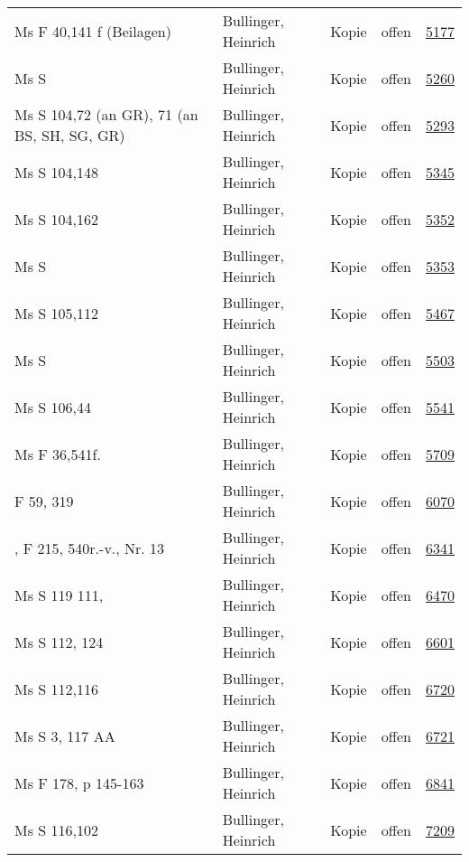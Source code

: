 \documentclass[10pt,a4paper,landscape]{report}
\begin{document}
\begin{longtable}{p{16cm}p{4cm}llr}
Ms F 40,141 f (Beilagen)	&	Bullinger, Heinrich	&	Kopie	&	offen	&	\href{http://130.60.24.72/assignment/5177}{5177}\\
Ms S	&	Bullinger, Heinrich	&	Kopie	&	offen	&	\href{http://130.60.24.72/assignment/5260}{5260}\\
Ms S 104,72 (an GR), 71 (an BS, SH, SG, GR)	&	Bullinger, Heinrich	&	Kopie	&	offen	&	\href{http://130.60.24.72/assignment/5293}{5293}\\
Ms S 104,148	&	Bullinger, Heinrich	&	Kopie	&	offen	&	\href{http://130.60.24.72/assignment/5345}{5345}\\
Ms S 104,162	&	Bullinger, Heinrich	&	Kopie	&	offen	&	\href{http://130.60.24.72/assignment/5352}{5352}\\
Ms S	&	Bullinger, Heinrich	&	Kopie	&	offen	&	\href{http://130.60.24.72/assignment/5353}{5353}\\
Ms S 105,112	&	Bullinger, Heinrich	&	Kopie	&	offen	&	\href{http://130.60.24.72/assignment/5467}{5467}\\
Ms S	&	Bullinger, Heinrich	&	Kopie	&	offen	&	\href{http://130.60.24.72/assignment/5503}{5503}\\
Ms S 106,44	&	Bullinger, Heinrich	&	Kopie	&	offen	&	\href{http://130.60.24.72/assignment/5541}{5541}\\
Ms F 36,541f.	&	Bullinger, Heinrich	&	Kopie	&	offen	&	\href{http://130.60.24.72/assignment/5709}{5709}\\
F 59, 319	&	Bullinger, Heinrich	&	Kopie	&	offen	&	\href{http://130.60.24.72/assignment/6070}{6070}\\
, F 215, 540r.-v., Nr. 13	&	Bullinger, Heinrich	&	Kopie	&	offen	&	\href{http://130.60.24.72/assignment/6341}{6341}\\
Ms S 119 111,	&	Bullinger, Heinrich	&	Kopie	&	offen	&	\href{http://130.60.24.72/assignment/6470}{6470}\\
Ms S 112, 124	&	Bullinger, Heinrich	&	Kopie	&	offen	&	\href{http://130.60.24.72/assignment/6601}{6601}\\
Ms S 112,116	&	Bullinger, Heinrich	&	Kopie	&	offen	&	\href{http://130.60.24.72/assignment/6720}{6720}\\
Ms S 3, 117 AA	&	Bullinger, Heinrich	&	Kopie	&	offen	&	\href{http://130.60.24.72/assignment/6721}{6721}\\
Ms F 178, p 145-163	&	Bullinger, Heinrich	&	Kopie	&	offen	&	\href{http://130.60.24.72/assignment/6841}{6841}\\
Ms S 116,102	&	Bullinger, Heinrich	&	Kopie	&	offen	&	\href{http://130.60.24.72/assignment/7209}{7209}\\

\end{longtable}
\end{document}
